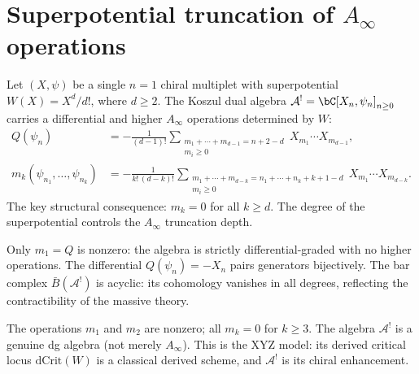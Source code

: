 \section{Superpotential truncation of \texorpdfstring{$A_\infty$}{A-infinity} operations}
\label{sec:superpotential-ainfty-truncation}

\providecommand{\dCrit}{\mathrm{dCrit}}

\begin{construction}
\label{constr:superpotential-ainfty}
Let $(X, \psi)$ be a single $n=1$ chiral multiplet with superpotential
$W(X) = X^d/d!$, where $d \geq 2$. The Koszul dual algebra
$\mathcal{A}^! = \bC[X_n, \psi_n]_{n \geq 0}$ carries a differential
and higher $A_\infty$ operations determined by $W$:
\begin{align}
Q(\psi_n) &= -\frac{1}{(d-1)!}
 \sum_{\substack{m_1 + \cdots + m_{d-1} = n+2-d \\ m_i \geq 0}}
 X_{m_1} \cdots X_{m_{d-1}},
\label{eq:superpotential-Q} \\
m_k(\psi_{n_1}, \ldots, \psi_{n_k}) &= -\frac{1}{k!\,(d-k)!}
 \sum_{\substack{m_1 + \cdots + m_{d-k} = n_1 + \cdots + n_k + k + 1 - d \\ m_i \geq 0}}
 X_{m_1} \cdots X_{m_{d-k}}.
\label{eq:superpotential-mk}
\end{align}
The key structural consequence: $m_k = 0$ for all $k \geq d$. The degree
of the superpotential controls the $A_\infty$ truncation depth.
\end{construction}

\begin{example}[$d = 2$: massive chiral, $W = \tfrac{1}{2}mX^2$]
\label{ex:superpotential-d2}
Only $m_1 = Q$ is nonzero: the algebra is strictly differential-graded with
no higher operations. The differential $Q(\psi_n) = -X_{n}$ pairs
generators bijectively. The bar complex $\bar{B}(\mathcal{A}^!)$ is
acyclic: its cohomology vanishes in all degrees, reflecting the
contractibility of the massive theory.
\end{example}

\begin{example}[$d = 3$: cubic Landau--Ginzburg, $W = \tfrac{1}{6}X^3$]
\label{ex:superpotential-d3}
The operations $m_1$ and $m_2$ are nonzero; all $m_k = 0$ for $k \geq 3$.
The algebra $\mathcal{A}^!$ is a genuine dg algebra (not merely
$A_\infty$). This is the XYZ model: its derived critical locus
$\dCrit(W)$ is a classical derived scheme, and $\mathcal{A}^!$ is its
chiral enhancement.
\end{example}

